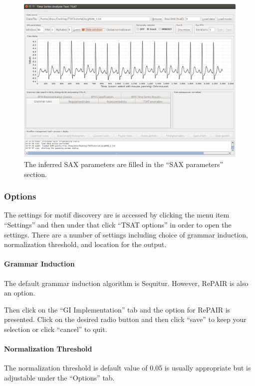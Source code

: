 \documentclass[letterpaper, 12pt]{article}
\begin{document}
\begin{figure}[H]
	\centering
	\includegraphics[width=\textwidth]{pictures/motifguide/step3-guessresults}
	\caption{The inferred SAX parameters are filled in the ``SAX parameters'' section.}
	\label{fig:step3-guessresults}
\end{figure}

\subsubsection{Options}

The settings for motif discovery are is accessed by clicking the menu item ``Settings'' and then under that click ``TSAT options'' in order to open the settings.  There are a number of settings including choice of grammar induction, normalization threshold, and location for the output.

\paragraph{Grammar Induction}
The default grammar induction algorithm is Sequitur.  However, RePAIR is also an option. 

Then click on the ``GI Implementation'' tab and the option for RePAIR is presented.  Click on the desired radio button and then click ``save'' to keep your selection or click ``cancel'' to quit.

\paragraph{Normalization Threshold}
The normalization threshold is default value of 0.05 is usually appropriate but is adjustable under the ``Options'' tab.
\end{document}
